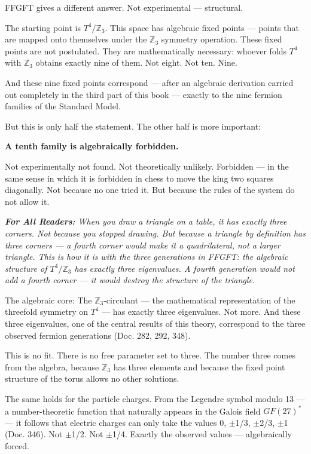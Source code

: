 \documentclass[11pt,oneside]{book}
\newenvironment{laierspur}{%
  \par\vspace{4pt}%
  \noindent\small\itshape\color{blue!60!black}%
  \textbf{For All Readers:}\enspace\ignorespaces}{%
  \par\vspace{4pt}\normalsize\normalfont\normalcolor}
\begin{document}
FFGFT gives a different answer. Not experimental — structural.

The starting point is $T^4/\mathbb{Z}_3$. This space has algebraic fixed points —
points that are mapped onto themselves under the $\mathbb{Z}_3$ symmetry operation.
These fixed points are not postulated. They are mathematically necessary:
whoever folds $T^4$ with $\mathbb{Z}_3$ obtains exactly nine of them. Not eight. Not
ten. Nine.

And these nine fixed points correspond — after an algebraic derivation
carried out completely in the third part of this book — exactly to the nine
fermion families of the Standard Model.

But this is only half the statement. The other half is more important:

\textbf{A tenth family is algebraically forbidden.}

Not experimentally not found. Not theoretically unlikely. Forbidden — in
the same sense in which it is forbidden in chess to move the king two
squares diagonally. Not because no one tried it. But because the rules of
the system do not allow it.

\begin{laierspur}
When you draw a triangle on a table, it has exactly three corners. Not
because you stopped drawing. But because a triangle by definition has three
corners — a fourth corner would make it a quadrilateral, not a larger
triangle. This is how it is with the three generations in FFGFT: the
algebraic structure of $T^4/\mathbb{Z}_3$ has exactly three eigenvalues. A fourth
generation would not add a fourth corner — it would destroy the structure
of the triangle.
\end{laierspur}

The algebraic core: The $\mathbb{Z}_3$-circulant — the mathematical representation of
the threefold symmetry on $T^4$ — has exactly three eigenvalues. Not more.
And these three eigenvalues, one of the central results of this theory,
correspond to the three observed fermion generations (Doc. 282, 292, 348).

This is no fit. There is no free parameter set to three. The number three
comes from the algebra, because $\mathbb{Z}_3$ has three elements and because the
fixed point structure of the torus allows no other solutions.

The same holds for the particle charges. From the Legendre symbol modulo 13 —
a number-theoretic function that naturally appears in the Galois field
$GF(27)^*$ — it follows that electric charges can only take the values 0,
$\pm$1/3, $\pm$2/3, $\pm$1 (Doc. 346). Not $\pm$1/2. Not $\pm$1/4. Exactly the observed
values — algebraically forced.
\end{document}
